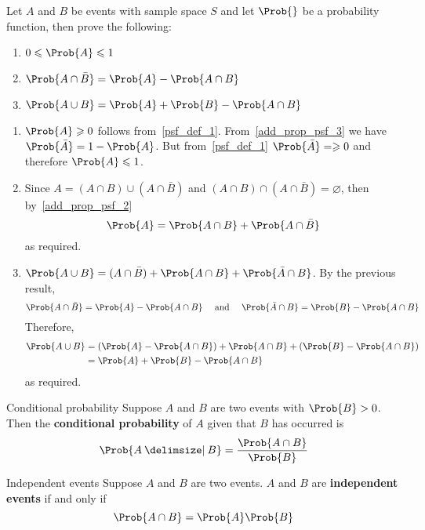 \begin{Exercise}{}{}
    Let $ A $ and $ B $ be events with sample space $ S $
    and let $ \Prob{} $ be a probability function, then prove the following:
    \begin{enumerate}
        \item $ 0\leqslant \Prob{A}\leqslant 1 $
        \item $ \Prob{A\cap\bar{B}}=\Prob{A}-\Prob{A\cap B} $
        \item $ \Prob{A\cup B}=\Prob{A}+\Prob{B}-\Prob{A\cap B} $
    \end{enumerate}
\end{Exercise}
\begin{enumerate}
    \item $ \Prob{A}\geqslant 0 $ follows from~\ref{psf_def_1}. From~\ref{add_prop_psf_3}
          we have $ \Prob{\bar{A}}=1-\Prob{A} $. But from~\ref{psf_def_1} $ \Prob{\bar{A}}=\geqslant 0 $
          and therefore $ \Prob{A}\leqslant 1 $.
    \item Since $ A=(A\cap B)\cup (A\cap \bar{B}) $ and $ (A\cap B)\cap (A\cap \bar{B})
              =\varnothing $, then by~\ref{add_prop_psf_2}
          \[ \Prob{A}=\Prob{A\cap B}+\Prob{A\cap\bar{B}} \]
          as required.
    \item $ \Prob{A\cup B}=(A\cap \bar{B})+\Prob{A\cap B}+\Prob{\bar{A}\cap B} $. By the previous
          result,
          \[ \Prob{A\cap \bar{B}}=\Prob{A}-\Prob{A\cap B}\quad\text{ and }\quad\Prob{\bar{A}\cap B}=\Prob{B}-\Prob{A\cap B}\]
          Therefore,
          \begin{align*}
              \Prob{A\cup B} & =(\Prob{A}-\Prob{A\cap B})+\Prob{A\cap B}+(\Prob{B}-\Prob{A\cap B}) \\
                             & =\Prob{A}+\Prob{B}-\Prob{A\cap B}
          \end{align*}
          as required.
\end{enumerate}

\begin{Definition}{Conditional probability}{}
    Suppose $ A $ and $ B $ are two events with
    $ \Prob{B}>0 $. Then the \textbf{conditional probability}
    of $ A $ given that $ B $ has occurred is
    \[ \Prob{A\given B}=\frac{\Prob{A\cap B}}{\Prob{B}} \]
\end{Definition}

\begin{Definition}{Independent events}{}
    Suppose $ A $ and $ B $ are two events. $ A $ and
    $ B $ are \textbf{independent events} if and only if
    \[ \Prob{A\cap B}=\Prob{A}\Prob{B} \]
\end{Definition}

